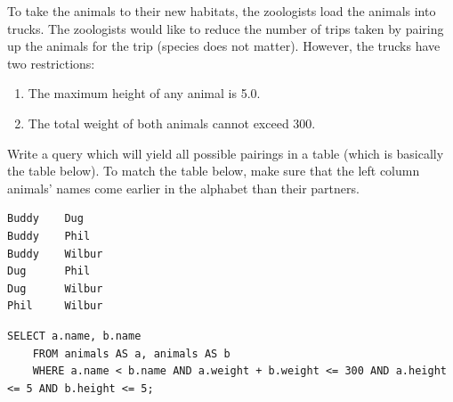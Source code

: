 \begin{blocksection}
 To take the animals to their new habitats, the zoologists load the animals into trucks. The zoologists would like to reduce the number of trips taken by pairing up the animals for the trip (species does not matter). However, the trucks have two restrictions:
\begin{enumerate}
    \item The maximum height of any animal is 5.0.
    \item The total weight of both animals cannot exceed 300.
\end{enumerate}

Write a query which will yield all possible pairings in a table (which is basically the table below). To match the table below, make sure that the left column animals' names come earlier in the alphabet than their partners.

\begin{lstlisting}
Buddy 	 Dug 
Buddy 	 Phil 
Buddy 	 Wilbur 
Dug 	 Phil 
Dug 	 Wilbur 
Phil 	 Wilbur
\end{lstlisting}

\begin{solution}[1in]
\begin{lstlisting}
SELECT a.name, b.name 
    FROM animals AS a, animals AS b 
    WHERE a.name < b.name AND a.weight + b.weight <= 300 AND a.height <= 5 AND b.height <= 5;
\end{lstlisting}
\end{solution}
\end{blocksection}
    
